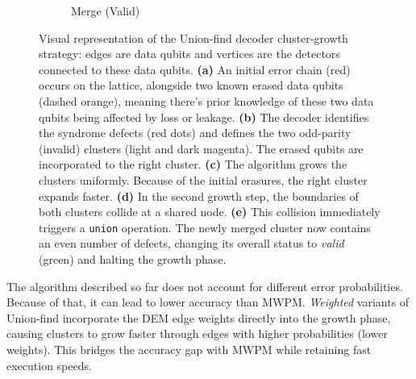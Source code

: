\begin{figure}[hbt!]
\begin{subfigure}[b]{0.19\textwidth}
{
        }
        \caption{Merge (Valid)}
    \end{subfigure}

    \caption[Visual representation of the Union-find decoder cluster-growth strategy.]{Visual representation of the Union-find decoder cluster-growth strategy: edges are data qubits and vertices are the detectors connected to these data qubits. \textbf{(a)} An initial error chain (red) occurs on the lattice, alongside two known erased data qubits (dashed orange), meaning there's prior knowledge of these two data qubits being affected by loss or leakage. \textbf{(b)} The decoder identifies the syndrome defects (red dots) and defines the two odd-parity (invalid) clusters (light and dark magenta). The erased qubits are incorporated to the right cluster. \textbf{(c)} The algorithm grows the clusters uniformly. Because of the initial erasures, the right cluster expands faster. \textbf{(d)} In the second growth step, the boundaries of both clusters collide at a shared node. \textbf{(e)} This collision immediately triggers a \texttt{union} operation. The newly merged cluster now contains an even number of defects, changing its overall status to \textit{valid} (green) and halting the growth phase.}
    \label{fig:union_find_steps}
\end{figure}



The algorithm described so far does not account for different error probabilities. Because of that, it can lead to lower accuracy than MWPM. \textit{Weighted} variants of Union-find incorporate the DEM edge weights directly into the growth phase, causing clusters to grow faster through edges with higher probabilities (lower weights). This bridges the accuracy gap with MWPM while retaining fast execution speeds.

